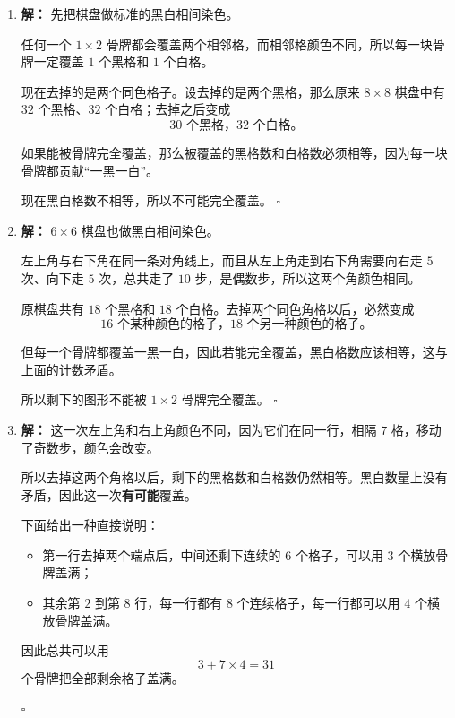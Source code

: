 \documentclass[11pt,a4paper,fontset=fandol]{ctexart}
\theoremstyle{formalexample}
\newenvironment{solution}{\par\noindent\textbf{解：}}{\hfill$\square$\par}
\begin{document}
\begin{enumerate}
  \item \begin{solution}
  先把棋盘做标准的黑白相间染色。

  任何一个 $1\times 2$ 骨牌都会覆盖两个相邻格，而相邻格颜色不同，所以每一块骨牌一定覆盖 $1$ 个黑格和 $1$ 个白格。

  现在去掉的是两个同色格子。设去掉的是两个黑格，那么原来 $8\times 8$ 棋盘中有 $32$ 个黑格、$32$ 个白格；去掉之后变成
  \[
  30\text{ 个黑格，}32\text{ 个白格}。
  \]

  如果能被骨牌完全覆盖，那么被覆盖的黑格数和白格数必须相等，因为每一块骨牌都贡献“一黑一白”。

  现在黑白格数不相等，所以不可能完全覆盖。
  \end{solution}

  \item \begin{solution}
  $6\times 6$ 棋盘也做黑白相间染色。

  左上角与右下角在同一条对角线上，而且从左上角走到右下角需要向右走 $5$ 次、向下走 $5$ 次，总共走了 $10$ 步，是偶数步，所以这两个角颜色相同。

  原棋盘共有 $18$ 个黑格和 $18$ 个白格。去掉两个同色角格以后，必然变成
  \[
  16\text{ 个某种颜色的格子，}18\text{ 个另一种颜色的格子}。
  \]

  但每一个骨牌都覆盖一黑一白，因此若能完全覆盖，黑白格数应该相等，这与上面的计数矛盾。

  所以剩下的图形不能被 $1\times 2$ 骨牌完全覆盖。
  \end{solution}

  \item \begin{solution}
  这一次左上角和右上角颜色不同，因为它们在同一行，相隔 $7$ 格，移动了奇数步，颜色会改变。

  所以去掉这两个角格以后，剩下的黑格数和白格数仍然相等。黑白数量上没有矛盾，因此这一次\textbf{有可能}覆盖。

  下面给出一种直接说明：
  \begin{itemize}
    \item 第一行去掉两个端点后，中间还剩下连续的 $6$ 个格子，可以用 $3$ 个横放骨牌盖满；
    \item 其余第 $2$ 到第 $8$ 行，每一行都有 $8$ 个连续格子，每一行都可以用 $4$ 个横放骨牌盖满。
  \end{itemize}

  因此总共可以用
  \[
  3+7\times 4=31
  \]
  个骨牌把全部剩余格子盖满。


\end{solution}
\end{enumerate}
\end{document}
